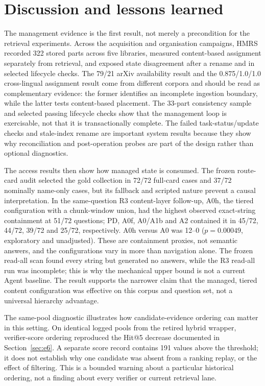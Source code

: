 \section{Discussion and lessons learned}
\label{sec:discussion}

The management evidence is the first result, not merely a precondition for the
retrieval experiments. Across the acquisition and organisation campaigns, HMRS
recorded 322 stored parts across five libraries, measured content-based
assignment separately from retrieval, and exposed state disagreement after a
rename and in selected lifecycle checks. The 79/21 arXiv availability result
and the 0.875/1.0/1.0 cross-lingual assignment result come from different
corpora and should be read as complementary evidence: the former identifies an
incomplete ingestion boundary, while the latter tests content-based placement.
The 33-part consistency sample and selected passing lifecycle checks show
that the management loop is exercisable, not that it is transactionally
complete. The failed task-status/update checks and stale-index rename are
important system results because they show why reconciliation and post-operation
probes are part of the design rather than optional diagnostics.

The access results then show how managed state is consumed. The frozen route-card
audit selected the gold collection in 72/72 full-card cases and 37/72 nominally
name-only cases, but its fallback and scripted nature prevent a causal
interpretation. In the same-question R3 content-layer follow-up, A0h, the tiered
configuration with a chunk-window union, had the highest observed exact-string
containment at 51/72 questions; PD, A0f, A0/A1b and A2 contained it in
45/72, 44/72, 39/72 and 25/72, respectively. A0h versus A0 was 12--0
($p=0.00049$, exploratory and unadjusted). These are containment proxies, not
semantic answers, and the configurations vary in more than navigation alone.
The frozen read-all scan found every string but generated no answers, while the
R3 read-all run was incomplete; this is why the mechanical upper bound is not a
current Agent baseline. The result supports the narrower claim that the
managed, tiered content configuration was effective on this corpus and question
set, not a universal hierarchy advantage.

The same-pool diagnostic illustrates how candidate-evidence ordering can matter
in this setting. On identical logged pools from the retired hybrid wrapper,
verifier-score ordering reproduced the Hit@5 decrease documented in
Section~\ref{sec:e6}. A separate score record contains 191 values above the
threshold; it does not establish why one candidate was absent from a ranking
replay, or the effect of filtering. This is a bounded warning about a
particular historical ordering, not a finding about every verifier or current
retrieval lane.

